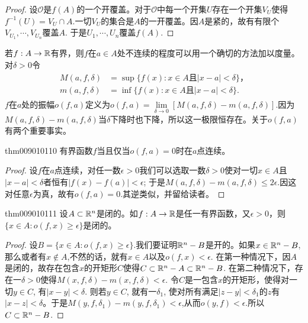 \begin{proof}
设$\mathscr{O}$是$f(A)$的一个开覆盖。对于$\mathscr{O}$中每一个开集$U$存在一个开集$V_U$使得$f^{-1}(U) = V_U \cap A$.一切$V_U$的集合是$A$的一开覆盖。因$A$是紧的，故有有限个$V_{U_1}, \cdots, V_{U_n}$覆盖$A$. 于是$U_1, \cdots, U_n$覆盖$f(A)$.
\end{proof}

若$f:A \to \mathbb{R}$有界，则$f$在$a \in A$处不连续的程度可以用一个确切的方法加以度量。对$\delta > 0$令
\begin{gather*}
\begin{aligned}
M(a,f,\delta) &= \sup\{f(x):x \in A\text{且}|x-a|<\delta\}，\\
m(a,f,\delta) &= \inf\{f(x):x \in A\text{且}|x-a|<\delta\}.
\end{aligned}
\end{gather*}
$f$在$a$处的振幅$o(f,a)$定义为$o(f,a) = \lim\limits_{\delta \to 0}{[M(a,f,\delta) - m(a,f,\delta)]}$.因为$M(a,f,\delta)-m(a,f,\delta)$当$\delta$下降时也下降，所以这一极限恒存在。关于$o(f,a)$有两个重要事实。

\begin{theorem}{}{thm009010110}
有界函数$f$当且仅当$o(f, a)=0$时在$a$点连续。
\end{theorem}

\begin{proof}
设$f$在$a$点连续，对任一数$\epsilon>0$我们可以选取一数$\delta>0$使对一切$x \in A$且$|x-a|<\delta$者恒有$|f(x)-f(a)|<\epsilon$; 于是$M(a,f,\delta) - m(a,f,\delta) \le 2\epsilon$.因这对任意$\epsilon$为真，故有$o(f, a) = 0$.其逆类似，并留给读者。
\end{proof}

\begin{theorem}{}{thm009010111}
设$A \subset \mathbb{R}^n$是闭的。如$f:A \to \mathbb{R}$是任一有界函数，又$\epsilon>0$，则$\{x \in A: o(f, x) \ge \epsilon\}$是闭的。
\end{theorem}

\begin{proof}
设$B = \{x \in A: o(f, x) \ge \epsilon\}$.我们要证明$\mathbb{R}^n - B$是开的。如果$x \in \mathbb{R}^n-B$,那么或者有$x \not\in A$,不然的话，就有$x \in A$以及$o(f, x) < \epsilon$. 在第一种情况下，因$A$是闭的，故存在包含$x$的开矩形$C$使得$C \subset \mathbb{R}^n-A \subset \mathbb{R}^n-B$. 在第二种情况下，存在一$\delta>0$使得$M(x, f, \delta) - m(x, f, \delta) < \epsilon$. 令$C$是一包含$x$的开矩形，使得对一切$y \in C$, 有$|x-y|<\delta$. 则若$y \in C$, 就有一$\delta_1$, 使对所有满足$|z-y|<\delta_1$的$z$有$|x-z|<\delta$。于是$M(y,f,\delta_1) - m(y, f,\delta_1) < \epsilon$,从而$o(y, f) < \epsilon$.所以$C \subset \mathbb{R}^n-B$.
\end{proof}

